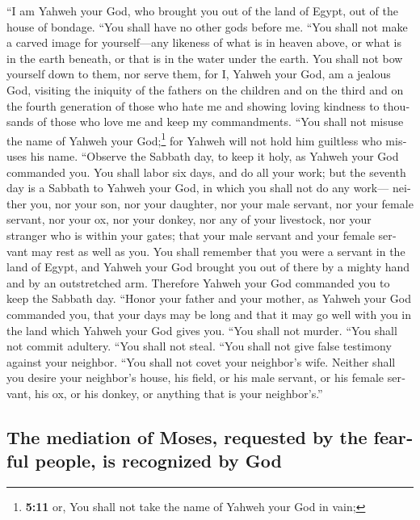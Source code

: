 \begin{paracol}{2}
\begin{otherlanguage}{english}
 ``I am Yahweh your God, who brought you out of the land
of Egypt, out of the house of bondage.  ``You shall have
no other gods before me.  ``You shall not make a carved
image for yourself---any likeness of what is in heaven above, or what is
in the earth beneath, or that is in the water under the earth.
 You shall not bow yourself down to them, nor serve them,
for I, Yahweh your God, am a jealous God, visiting the iniquity of the
fathers on the children and on the third and on the fourth generation of
those who hate me  and showing loving kindness to
thousands of those who love me and keep my commandments. 
``You shall not misuse the name of Yahweh your God;\footnote{\textbf{5:11}
  or, You shall not take the name of Yahweh your God in vain;} for
Yahweh will not hold him guiltless who misuses his name. 
``Observe the Sabbath day, to keep it holy, as Yahweh your God commanded
you.  You shall labor six days, and do all your work;
 but the seventh day is a Sabbath to Yahweh your God, in
which you shall not do any work--- neither you, nor your son, nor your
daughter, nor your male servant, nor your female servant, nor your ox,
nor your donkey, nor any of your livestock, nor your stranger who is
within your gates; that your male servant and your female servant may
rest as well as you.  You shall remember that you were a
servant in the land of Egypt, and Yahweh your God brought you out of
there by a mighty hand and by an outstretched arm. Therefore Yahweh your
God commanded you to keep the Sabbath day.  ``Honor your
father and your mother, as Yahweh your God commanded you, that your days
may be long and that it may go well with you in the land which Yahweh
your God gives you.  ``You shall not murder.
 ``You shall not commit adultery.  ``You
shall not steal.  ``You shall not give false testimony
against your neighbor.  ``You shall not covet your
neighbor's wife. Neither shall you desire your neighbor's house, his
field, or his male servant, or his female servant, his ox, or his
donkey, or anything that is your neighbor's.''

\hypertarget{the-mediation-of-moses-requested-by-the-fearful-people-is-recognized-by-god}{%
\subsection{The mediation of Moses, requested by the fearful people, is
recognized by
God}\label{the-mediation-of-moses-requested-by-the-fearful-people-is-recognized-by-god}}


\end{otherlanguage}
\end{paracol}
